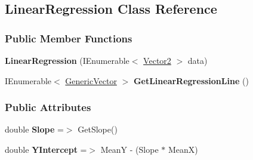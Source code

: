 \hypertarget{classDataTools_1_1regression_1_1LinearRegression}{}\subsection{Linear\+Regression Class Reference}
\label{classDataTools_1_1regression_1_1LinearRegression}
\subsubsection*{Public Member Functions}
\begin{DoxyCompactItemize}
\item 
\mbox{\label{classDataTools_1_1regression_1_1LinearRegression_a078ff0b1ed123224bbd3812dea2ab4cb}} 
{\bfseries Linear\+Regression} (I\+Enumerable$<$ \hyperlink{classDataTools_1_1Vector2}{Vector2} $>$ data)
\item 
\mbox{\label{classDataTools_1_1regression_1_1LinearRegression_ac15c1aae813e09c932acdb404220efb7}} 
I\+Enumerable$<$ \hyperlink{classDataTools_1_1GenericVector}{Generic\+Vector} $>$ {\bfseries Get\+Linear\+Regression\+Line} ()
\end{DoxyCompactItemize}
\subsubsection*{Public Attributes}
\begin{DoxyCompactItemize}
\item 
\mbox{\label{classDataTools_1_1regression_1_1LinearRegression_a4cde7a11956732a0838d90f771c3e2e9}} 
double {\bfseries Slope} =$>$ Get\+Slope()
\item 
\mbox{\label{classDataTools_1_1regression_1_1LinearRegression_a69a2f4813f4440c04e501208cd70cd1a}} 
double {\bfseries Y\+Intercept} =$>$ MeanY -\/ (Slope $\ast$ MeanX)
\end{DoxyCompactItemize}
